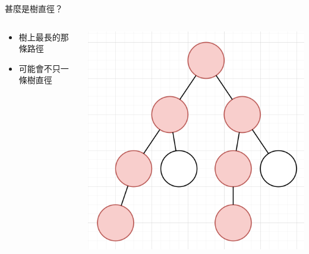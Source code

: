 \documentclass[aspectratio=169]{beamer}
\begin{document}
    \begin{frame}{甚麼是樹直徑？}
        \begin{columns}
            \begin{column}{0.45\textwidth}
            \begin{center}
                \begin{itemize}
                    \item 樹上最長的那條路徑
                    \item 可能會不只一條樹直徑
                \end{itemize}
            \end{center}
            \end{column}
            \begin{column}{0.5\textwidth}
                \begin{center}
                    \includegraphics[scale=0.4]{images/tree_diameter.png}
                \end{center}
            \end{column}
        \end{columns}
        
    \end{frame}
\end{document}
